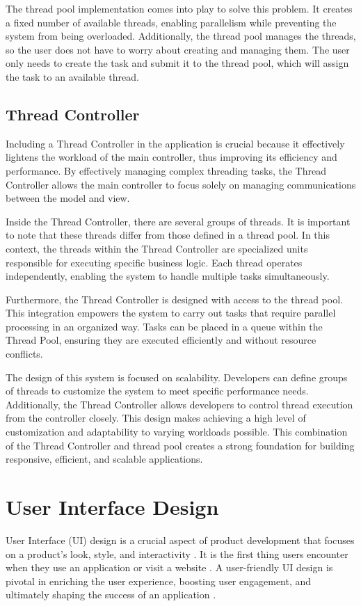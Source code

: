 The thread pool implementation comes into play to solve this problem. It creates a fixed number of available threads, enabling parallelism while preventing the system from being overloaded. Additionally, the thread pool manages the threads, so the user does not have to worry about creating and managing them. The user only needs to create the task and submit it to the thread pool, which will assign the task to an available thread.

\subsection{Thread Controller}
\label{subsec:thread-controller}

Including a Thread Controller in the application is crucial because it effectively lightens the workload of the main controller, thus improving its efficiency and performance. By effectively managing complex threading tasks, the Thread Controller allows the main controller to focus solely on managing communications between the model and view.

Inside the Thread Controller, there are several groups of threads. It is important to note that these threads differ from those defined in a thread pool. In this context, the threads within the Thread Controller are specialized units responsible for executing specific business logic. Each thread operates independently, enabling the system to handle multiple tasks simultaneously.

Furthermore, the Thread Controller is designed with access to the thread pool. This integration empowers the system to carry out tasks that require parallel processing in an organized way. Tasks can be placed in a queue within the Thread Pool, ensuring they are executed efficiently and without resource conflicts.

The design of this system is focused on scalability. Developers can define groups of threads to customize the system to meet specific performance needs. Additionally, the Thread Controller allows developers to control thread execution from the controller closely. This design makes achieving a high level of customization and adaptability to varying workloads possible. This combination of the Thread Controller and thread pool creates a strong foundation for building responsive, efficient, and scalable applications.


\section{User Interface Design}
User Interface (UI) design is a crucial aspect of product development that focuses on a product's look, style, and interactivity \cite{Coursera_2023}. It is the first thing users encounter when they use an application or visit a website \cite{Coursera_2023}.
A user-friendly UI design is pivotal in enriching the user experience, boosting user engagement, and ultimately shaping the success of an application \cite{AlgoRepublic_2023}.

